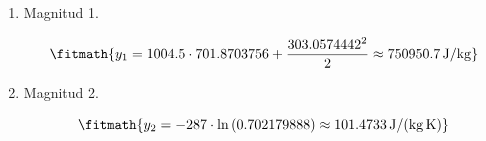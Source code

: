 \begin{enumerate}

\item Magnitud 1.

\[\fitmath{y_{1}=1004.5\cdot 701.8703756+\frac{{303.0574442}^{2}}{2}\approx 750950.7\,\mathrm{J/kg}}\]

\item Magnitud 2.

\[\fitmath{y_{2}=-287\cdot \ln\left(0.702179888\right)\approx 101.4733\,\mathrm{J/(kg\,K)}}\]

\end{enumerate}
